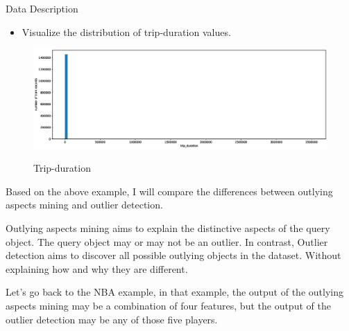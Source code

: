 \documentclass[
 size=14pt,
 paper=smartboard,  %
 mode=present, 		%
 display=slides, 	%
 style=tuliplab,  	%
 pauseslide,
 fleqn,leqno]{powerdot}
\begin{document}
\begin{slide}[toc=,bm=]{Data Description}

\begin{itemize}
\item Visualize the distribution of trip-duration values.
\end{itemize}

\begin{figure}
  \centering
   \includegraphics[width=1.0\textwidth]{figure//fig-1.eps}\\
  \caption{Trip-duration}\label{fig:demical}
\end{figure}


\begin{note}
Based on the above example,
I will compare the differences
between outlying aspects mining and outlier detection.

Outlying aspects mining aims to
explain the distinctive aspects of the query object.
The query object may or may not be an outlier.
In contrast,
Outlier detection aims to discover all possible
outlying objects in the dataset.
Without explaining how and why they are different.

Let's go back to the NBA example,
in that example,
the output of the outlying aspects mining may be
a combination of four features,
but the output of the outlier detection may be any of those five players.
\end{note}

\end{slide}



\end{document}
